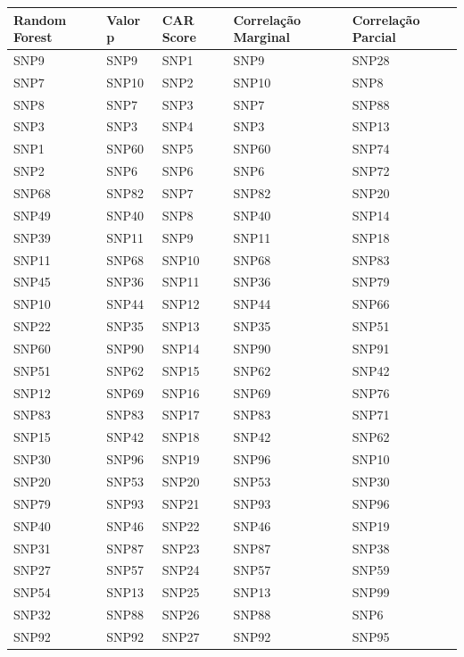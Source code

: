 \begin{table}[ht]
\centering
\begin{tabular}{lllll}
  \hline
Random Forest & Valor p & CAR Score & Correlação Marginal & Correlação Parcial \\ 
  \hline
SNP9 & SNP9 & SNP1 & SNP9 & SNP28 \\ 
  SNP7 & SNP10 & SNP2 & SNP10 & SNP8 \\ 
  SNP8 & SNP7 & SNP3 & SNP7 & SNP88 \\ 
  SNP3 & SNP3 & SNP4 & SNP3 & SNP13 \\ 
  SNP1 & SNP60 & SNP5 & SNP60 & SNP74 \\ 
  SNP2 & SNP6 & SNP6 & SNP6 & SNP72 \\ 
  SNP68 & SNP82 & SNP7 & SNP82 & SNP20 \\ 
  SNP49 & SNP40 & SNP8 & SNP40 & SNP14 \\ 
  SNP39 & SNP11 & SNP9 & SNP11 & SNP18 \\ 
  SNP11 & SNP68 & SNP10 & SNP68 & SNP83 \\ 
  SNP45 & SNP36 & SNP11 & SNP36 & SNP79 \\ 
  SNP10 & SNP44 & SNP12 & SNP44 & SNP66 \\ 
  SNP22 & SNP35 & SNP13 & SNP35 & SNP51 \\ 
  SNP60 & SNP90 & SNP14 & SNP90 & SNP91 \\ 
  SNP51 & SNP62 & SNP15 & SNP62 & SNP42 \\ 
  SNP12 & SNP69 & SNP16 & SNP69 & SNP76 \\ 
  SNP83 & SNP83 & SNP17 & SNP83 & SNP71 \\ 
  SNP15 & SNP42 & SNP18 & SNP42 & SNP62 \\ 
  SNP30 & SNP96 & SNP19 & SNP96 & SNP10 \\ 
  SNP20 & SNP53 & SNP20 & SNP53 & SNP30 \\ 
  SNP79 & SNP93 & SNP21 & SNP93 & SNP96 \\ 
  SNP40 & SNP46 & SNP22 & SNP46 & SNP19 \\ 
  SNP31 & SNP87 & SNP23 & SNP87 & SNP38 \\ 
  SNP27 & SNP57 & SNP24 & SNP57 & SNP59 \\ 
  SNP54 & SNP13 & SNP25 & SNP13 & SNP99 \\ 
  SNP32 & SNP88 & SNP26 & SNP88 & SNP6 \\ 
  SNP92 & SNP92 & SNP27 & SNP92 & SNP95 \\ 

\end{tabular}
\end{table}
